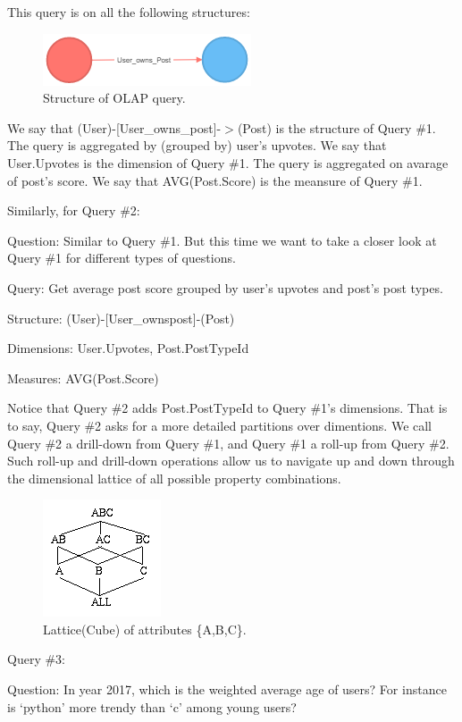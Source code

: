 This query is on all the following structures:

\begin {figure}[H]
\centering
\includegraphics[scale=1]{pic/21.png}
\caption{Structure of OLAP query.}
\end{figure}

We say that (User)-[User\_owns\_post]-$>$(Post) is the structure of Query \#1.
The query is aggregated by (grouped by) user’s upvotes. We say that {User.Upvotes} is the dimension of Query \#1.
The query is aggregated on avarage of post’s score.  We say that {AVG(Post.Score)} is the meansure of Query \#1. 
 
Similarly, for Query \#2:

Question: 	Similar to Query \#1. But this time we want to take a closer look at Query \#1 for different types of questions. 

Query: 		Get average post score grouped by user’s upvotes and post’s post types. 

Structure:	(User)-[User\_ownspost]-(Post)

Dimensions:	{User.Upvotes, Post.PostTypeId}

Measures:	{AVG(Post.Score)}
 
Notice that Query \#2 adds Post.PostTypeId to Query \#1’s dimensions. That is to say, Query \#2 asks for a more detailed partitions over dimentions. We call Query \#2 a drill-down from Query \#1, and  Query \#1 a roll-up from Query \#2. Such roll-up and drill-down operations allow us to navigate up and down through the dimensional lattice of all possible property combinations. 

\begin {figure}[H]
\centering
\includegraphics[scale=1]{pic/22.png}
\caption{Lattice(Cube) of attributes \{A,B,C\}.}
\end{figure}

Query \#3:

Question: 	In year 2017, which is the weighted average age of users? For instance is ‘python’ more trendy than ‘c’ among young users?
 
